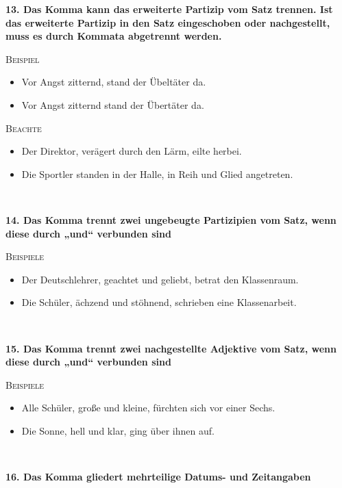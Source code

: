 \documentclass[landscape]{article}
\newcommand{\tbreak}{\\\vspace{-3mm}}
\newcommand*\glqq{„}
\newcommand*\grqq{“}
\newcommand{\gqm}[1]{\glqq #1\grqq}
\begin{document}
\begin{multicols*}{3}
    \textbf{13. Das Komma kann das erweiterte Partizip vom Satz trennen. Ist das erweiterte Partizip in den Satz eingeschoben oder nachgestellt, muss es durch Kommata abgetrennt werden.}\tbreak
    
    \textsc{Beispiel}\\

    \begin{itemize}
        \item Vor Angst zitternd, stand der Übeltäter da.
        \item Vor Angst zitternd stand der Übertäter da.
    \end{itemize}\quad\vspace{-4mm}

    \textsc{Beachte}\\
    
    \begin{itemize}
        \item Der Direktor, verägert durch den Lärm, eilte herbei.
        \item Die Sportler standen in der Halle, in Reih und Glied angetreten.
    \end{itemize}\quad\tbreak

    \textbf{14. Das Komma trennt zwei ungebeugte Partizipien vom Satz, wenn diese durch \gqm{und} verbunden sind}\tbreak

    \textsc{Beispiele}\\

    \begin{itemize}
        \item Der Deutschlehrer, geachtet und geliebt, betrat den Klassenraum.
        \item Die Schüler, ächzend und stöhnend, schrieben eine Klassenarbeit.
    \end{itemize}\quad\tbreak

    \textbf{15. Das Komma trennt zwei nachgestellte Adjektive vom Satz, wenn diese durch \gqm{und} verbunden sind}\tbreak

    \textsc{Beispiele}\\

    \begin{itemize}
        \item Alle Schüler, große und kleine, fürchten sich vor einer Sechs.
        \item Die Sonne, hell und klar, ging über ihnen auf.
    \end{itemize}\quad\tbreak

    \textbf{16. Das Komma gliedert mehrteilige Datums- und Zeitangaben}\tbreak


\end{multicols*}
\end{document}
